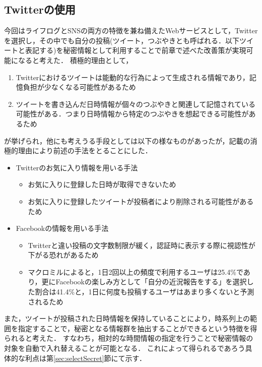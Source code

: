\subsection{Twitterの使用}
今回はライフログとSNSの両方の特徴を兼ね備えたWebサービスとして，Twitterを選択し，その中でも自分の投稿(ツイート，つぶやきとも呼ばれる．以下ツイートと表記する)を秘密情報として利用することで前章で述べた改善策が実現可能になると考えた．
積極的理由として，
\begin{enumerate}
  \item Twitterにおけるツイートは能動的な行為によって生成される情報であり，記憶負担が少なくなる可能性があるため
  \item ツイートを書き込んだ日時情報が個々のつぶやきと関連して記憶されている可能性がある．つまり日時情報から特定のつぶやきを想起できる可能性があるため
\end{enumerate}
が挙げられ，他にも考えうる手段としては以下の様なものがあったが，記載の消極的理由により前述の手法をとることにした．
\begin{itemize}
  \item Twitterのお気に入り情報を用いる手法
  \begin{itemize}
    \item お気に入りに登録した日時が取得できないため
    \item お気に入りに登録したツイートが投稿者により削除される可能性があるため
  \end{itemize}
  \item Facebookの情報を用いる手法
  \begin{itemize}
    \item Twitterと違い投稿の文字数制限が緩く，認証時に表示する際に視認性が下がる恐れがあるため
    \item マクロミル\cite{macromillFacebookReport}によると，1日2回以上の頻度で利用するユーザは25.4\%であり，更にFacebookの楽しみ方として「自分の近況報告をする」を選択した割合は41.4\%と，1日に何度も投稿するユーザはあまり多くないと予測されるため
  \end{itemize}
\end{itemize}

また，ツイートが投稿された日時情報を保持していることにより，時系列上の範囲を指定することで，秘密となる情報群を抽出することができるという特徴を得られると考えた．
すなわち，相対的な時間情報の指定を行うことで秘密情報の対象を自動で入れ替えることが可能となる．
これによって得られるであろう具体的な利点は第\ref{sec:selectSecret}節にて示す．

